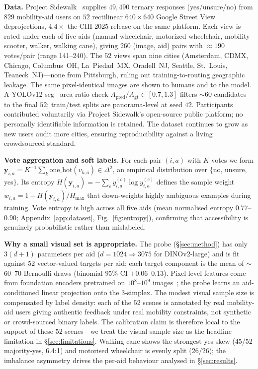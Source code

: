 \documentclass{article}
\newcommand{\hmax}{H_{\max}}
\begin{document}
\textbf{Data.} Project Sidewalk~\citep{Saha_ProjectSidewalk_CHI2019,DBLP:journals/corr/abs-2502-19888} supplies $49{,}490$ ternary responses (yes/unsure/no) from $829$ mobility-aid users on $52$ rectilinear $640{\times}640$ Google Street View deprojections, $4.4\times$ the CHI 2025 release on the same platform. Each view is rated under each of five aids (manual wheelchair, motorized wheelchair, mobility scooter, walker, walking cane), giving $260$ (image, aid) pairs with $\approx 190$ votes/pair (range 141--240). The $52$ views span nine cities (Amsterdam, CDMX, Chicago, Columbus~OH, La~Piedad~MX, Oradell~NJ, Seattle, St.~Louis, Teaneck~NJ)---none from Pittsburgh, ruling out training-to-routing geographic leakage. The same pixel-identical images are shown to humans and to the model. A YOLOv12-seg~\citep{tian2025yolov12attentioncentricrealtimeobject} area-ratio check $A_{\mathrm{pred}}/A_{\mathrm{gt}}\in[0.7,1.3]$ filters $\sim 60$ candidates to the final $52$; train/test splits are panorama-level at seed $42$. Participants contributed voluntarily via Project Sidewalk's open-source public platform; no personally identifiable information is retained. The dataset continues to grow as new users audit more cities, ensuring reproducibility against a living crowdsourced standard.

\textbf{Vote aggregation and soft labels.} For each pair $(i,a)$ with $K$ votes we form
$\mathbf{y}_{i,a} = K^{-1}\sum_{k} \mathrm{one\_hot}(v_{k,a}) \in \Delta^2$, an empirical distribution over $\{$no, unsure, yes$\}$. Its entropy $H(\mathbf{y}_{i,a}) = -\sum_c y_{i,a}^{(c)} \log y_{i,a}^{(c)}$ defines the sample weight $w_{i,a} = 1 - H(\mathbf{y}_{i,a})/\hmax$ that down-weights highly ambiguous examples during training. Vote entropy is high across all five aids (mean normalised entropy $0.77$--$0.90$; Appendix~\ref{app:dataset}, Fig.~\ref{fig:entropy}), confirming that accessibility is genuinely probabilistic rather than mislabeled.

\textbf{Why a small visual set is appropriate.} The probe (\S\ref{sec:method}) has only $3(d{+}1)$ parameters per aid ($d=1024 \Rightarrow 3075$ for DINOv2-large) and is fit against $52$ vector-valued targets per aid; each target component is the mean of $\sim$60--70 Bernoulli draws (binomial $95\%$ CI $\pm 0.06$--$0.13$). Pixel-level features come from foundation encoders pretrained on $10^8$--$10^9$ images~\citep{radford2021learningtransferablevisualmodels,oquab2023dinov2,tschannen2025siglip2}; the probe learns an aid-conditioned linear projection onto the 3-simplex. The modest visual sample size is compensated by label density: each of the $52$ scenes is annotated by real mobility-aid users giving authentic feedback under real mobility constraints, not synthetic or crowd-sourced binary labels. The calibration claim is therefore local to the support of these $52$ scenes---we treat the visual sample size as the headline limitation in \S\ref{sec:limitations}. Walking cane shows the strongest yes-skew (45/52 majority-yes, 6.4:1) and motorised wheelchair is evenly split (26/26); the imbalance asymmetry drives the per-aid behaviour analysed in \S\ref{sec:results}.
\end{document}
